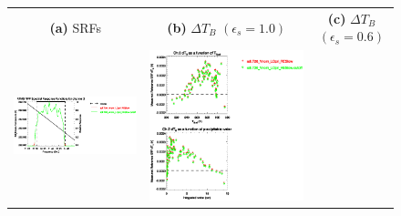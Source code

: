 \begin{figure}[H]
  \centering
  \begin{tabular}{c c c}
    \textsf{\textbf{(a)} SRFs} &
    \textsf{\textbf{(b)} $\Delta T_B$ $(\epsilon_s = 1.0)$} &
    \textsf{\textbf{(c)} $\Delta T_B$ $(\epsilon_s = 0.6)$} \\
    \includegraphics[bb=80 400 280 558,clip,scale=0.85]{graphics/srf/Rset/atms_npp.ch2.osrf.eps} &
    \includegraphics[bb=85 400 260 558,clip,scale=0.85]{graphics/dtb/Rset/e1.0_r0.0/atms_npp.ch2.dTb.eps} & 

\end{tabular}
\end{figure}
